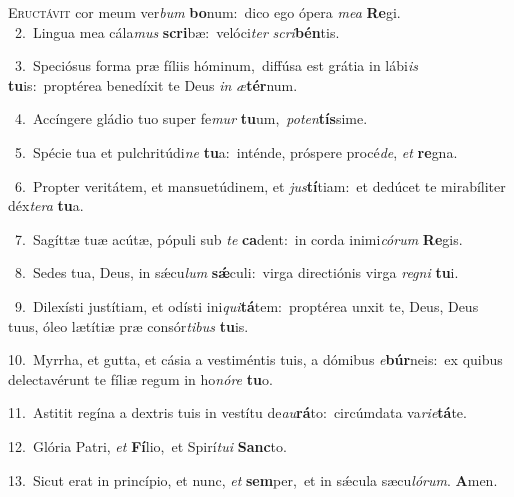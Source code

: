 \lettrine{\initial\textcolor{\initialcolor}{E}}{ructávit} cor meum ver\textit{bum} \textbf{bo}\-num:~\star dico ego ópera \textit{me}\-\textit{a} \textbf{Re}\-gi.\\
{\numbfont\textcolor{\numbcolor}{~2.}}~Lingua mea cála\textit{mus} \textbf{scri}\-bæ:~\star velóci\textit{ter} \textit{scri}\-\textbf{bén}tis.\par
{\numbfont\textcolor{\numbcolor}{~3.}}~Speciósus forma præ fíliis hóminum,~\dagger diffúsa est grátia in lábi\textit{is} \textbf{tu}\-is:~\star proptérea benedíxit te Deus \textit{in} \textit{æ}\-\textbf{tér}num.\par
{\numbfont\textcolor{\numbcolor}{~4.}}~Accíngere gládio tuo super fe\textit{mur} \textbf{tu}\-um,~\star \textit{pot}\-\textit{en}\textbf{tís}sime.\par
{\numbfont\textcolor{\numbcolor}{~5.}}~Spécie tua et pulchritúdi\textit{ne} \textbf{tu}\-a:~\star inténde, próspere procé\-\textit{de}\-, \textit{et} \textbf{re}\-gna.\par
{\numbfont\textcolor{\numbcolor}{~6.}}~Propter veritátem, et mansuetúdinem, et \textit{jus}\-\textbf{tí}tiam:~\star et dedúcet te mirabíliter déx\-\textit{te}\-\textit{ra} \textbf{tu}\-a.\par
{\numbfont\textcolor{\numbcolor}{~7.}}~Sagíttæ tuæ acútæ, pópuli sub \textit{te} \textbf{ca}\-dent:~\star in corda inimi\-\textit{có}\-\textit{rum} \textbf{Re}\-gis.\par
{\numbfont\textcolor{\numbcolor}{~8.}}~Sedes tua, Deus, in sǽcu\textit{lum} \textbf{sǽ}\-culi:~\star virga directiónis virga \textit{re}\-\textit{gni} \textbf{tu}\-i.\par
{\numbfont\textcolor{\numbcolor}{~9.}}~Dilexísti justítiam, et odísti ini\-\textit{qui}\-\textbf{tá}tem:~\star proptérea unxit te, Deus, Deus tuus, óleo lætítiæ præ consór\-\textit{ti}\-\textit{bus} \textbf{tu}\-is.\par
{\numbfont\textcolor{\numbcolor}{10.}}~Myrrha, et gutta, et cásia a vestiméntis tuis, a dómibus \textit{e}\-\textbf{búr}neis:~\star ex quibus delectavérunt te fíliæ regum in ho\-\textit{nó}\-\textit{re} \textbf{tu}\-o.\par
{\numbfont\textcolor{\numbcolor}{11.}}~Astitit regína a dextris tuis in vestítu de\-\textit{au}\-\textbf{rá}to:~\star circúmdata va\-\textit{ri}\-\textit{e}\textbf{tá}te.\par
{\numbfont\textcolor{\numbcolor}{12.}}~Glória Patri, \textit{et} \textbf{Fí}\-lio,~\star et Spirí\-\textit{tu}\-\textit{i} \textbf{Sanc}\-to.\par
{\numbfont\textcolor{\numbcolor}{13.}}~Sicut erat in princípio, et nunc, \textit{et} \textbf{sem}\-per,~\star et in sǽcula sæcu\-\textit{ló}\-\textit{rum}. \textbf{A}\-men.\par
